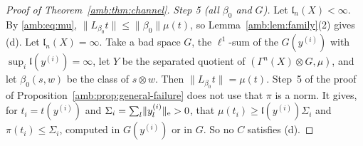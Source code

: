 \documentclass[11pt]{amsart}
\theoremstyle{definition}
\theoremstyle{remark}
\numberwithin{equation}{section}
\newcommand{\norm}[1]{\lVert #1\rVert}
\theoremstyle{plain}
\theoremstyle{definition}
\theoremstyle{plain}
\begin{document}
\begin{proof}[Proof of Theorem~\ref{amb:thm:channel}]
\emph{Step 5 (all $\beta_0$ and $G$).} Let $\mathfrak l_n(X)<\infty$. By \eqref{amb:eq:mu}, $\norm{L_{\beta_0}t}\le\norm{\beta_0}\mu(t)$, so Lemma~\ref{amb:lem:family}(2) gives (d). Let $\mathfrak l_n(X)=\infty$. Take a bad space $G$, the $\ell^1$-sum of the $G(y^{(i)})$ with $\sup_i\mathfrak l(y^{(i)})=\infty$, let $Y$ be the separated quotient of $(\Gamma^n(X)\otimes G,\mu)$, and let $\beta_0(s,w)$ be the class of $s\otimes w$. Then $\norm{L_{\beta_0}t}=\mu(t)$. Step~5 of the proof of Proposition~\ref{amb:prop:general-failure} does not use that $\pi$ is a norm. It gives, for $t_i=t(y^{(i)})$ and $\Sigma_i=\sum_l\norm{y^{(i)}_l}_{\rm e}>0$, that $\mu(t_i)\ge\mathfrak l(y^{(i)})\Sigma_i$ and $\pi(t_i)\le\Sigma_i$, computed in $G(y^{(i)})$ or in $G$. So no $C$ satisfies (d).
\end{proof}
\end{document}
